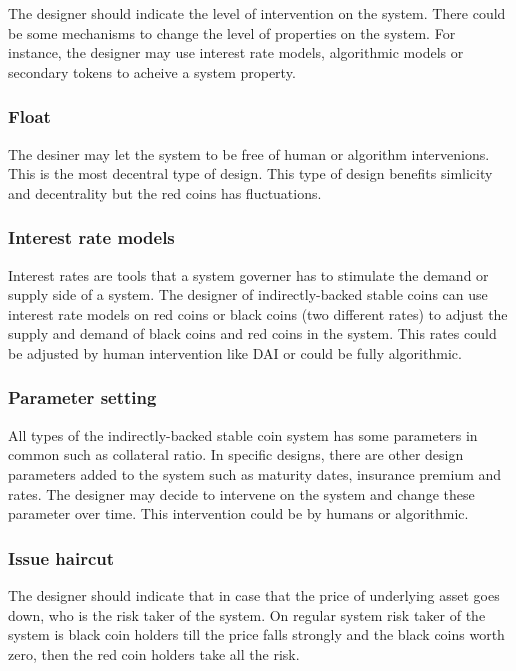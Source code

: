 \documentclass[runningheads]{llncs}
\begin{document}
The designer should indicate the level of intervention on the system. There could be some mechanisms to change the level of properties on the system. For instance, the designer may use interest rate models, algorithmic models or secondary tokens to acheive a system property.

\subsubsection{Float}

The desiner may let the system to be free of human or algorithm intervenions. This is the most decentral type of design. This type of design benefits simlicity and decentrality but the red coins has fluctuations.

\subsubsection{Interest rate models}

Interest rates are tools that a system governer has to stimulate the demand or supply side of a system. The designer of indirectly-backed stable coins can use interest rate models on red coins or black coins (two different rates) to adjust the supply and demand of black coins and red coins in the system. This rates could be adjusted by human intervention like DAI or could be fully algorithmic.

\subsubsection{Parameter setting}

All types of the indirectly-backed stable coin system has some parameters in common such as collateral ratio. In specific designs, there are other design parameters added to the system such as maturity dates, insurance premium and rates. The designer may decide to intervene on the system and change these parameter over time. This intervention could be by humans or algorithmic. 

\subsubsection{Issue haircut}

The designer should indicate that in case that the price of underlying asset goes down, who is the risk taker of the system. On regular system risk taker of the system is black coin holders till the price falls strongly and the black coins worth zero, then the red coin holders take all the risk.
\end{document}
